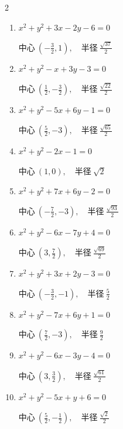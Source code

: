 \begin{multicols}{2}
\begin{enumerate}
        $\displaystyle 中心\: \left(-\frac{7}{2},1\right), \quad 半径 \ \frac{\sqrt{53}}{2}$

  \item $x^{2}+y^{2}+3x-2y-6=0$

        $\displaystyle 中心\: \left(-\frac{3}{2},1\right), \quad 半径 \ \frac{\sqrt{37}}{2}$

  \item $x^{2}+y^{2}-x+3y-3=0$

        $\displaystyle 中心\: \left(\frac{1}{2},-\frac{3}{2}\right), \quad 半径 \ \frac{\sqrt{22}}{2}$

  \item $x^{2}+y^{2}-5x+6y-1=0$

        $\displaystyle 中心\: \left(\frac{5}{2},-3\right), \quad 半径 \ \frac{\sqrt{65}}{2}$

  \item $x^{2}+y^{2}-2x-1=0$

        $\displaystyle 中心\: \left(1,0\right), \quad 半径 \ \sqrt{2}$

  \item $x^{2}+y^{2}+7x+6y-2=0$

        $\displaystyle 中心\: \left(-\frac{7}{2},-3\right), \quad 半径 \ \frac{\sqrt{93}}{2}$

  \item $x^{2}+y^{2}-6x-7y+4=0$

        $\displaystyle 中心\: \left(3,\frac{7}{2}\right), \quad 半径 \ \frac{\sqrt{69}}{2}$

  \item $x^{2}+y^{2}+3x+2y-3=0$

        $\displaystyle 中心\: \left(-\frac{3}{2},-1\right), \quad 半径 \ \frac{5}{2}$

  \item $x^{2}+y^{2}-7x+6y+1=0$

        $\displaystyle 中心\: \left(\frac{7}{2},-3\right), \quad 半径 \ \frac{9}{2}$

\columnbreak %

  \item $x^{2}+y^{2}-6x-3y-4=0$

        $\displaystyle 中心\: \left(3,\frac{3}{2}\right), \quad 半径 \ \frac{\sqrt{61}}{2}$

  \item $x^{2}+y^{2}-5x+y+6=0$

        $\displaystyle 中心\: \left(\frac{5}{2},-\frac{1}{2}\right), \quad 半径 \ \frac{\sqrt{2}}{2}$


\end{enumerate}
\end{multicols}
